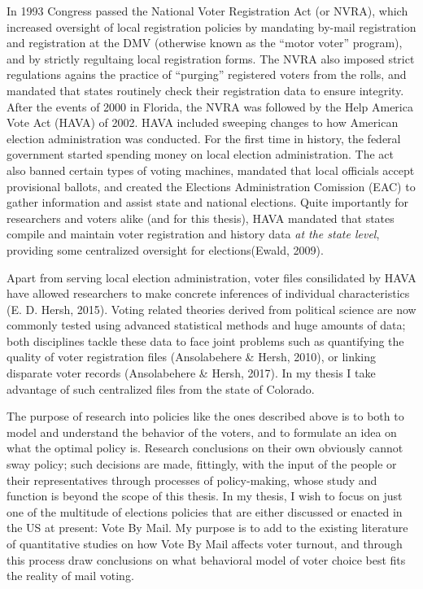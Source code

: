 \documentclass[12pt,twoside]{reedthesis}
\begin{document}
  In 1993 Congress passed the National Voter Registration Act (or NVRA),
  which increased oversight of local registration policies by mandating
  by-mail registration and registration at the DMV (otherwise known as the
  ``motor voter'' program), and by strictly regultaing local registration
  forms. The NVRA also imposed strict regulations agains the practice of
  ``purging'' registered voters from the rolls, and mandated that states
  routinely check their registration data to ensure integrity. After the
  events of 2000 in Florida, the NVRA was followed by the Help America
  Vote Act (HAVA) of 2002. HAVA included sweeping changes to how American
  election administration was conducted. For the first time in history,
  the federal government started spending money on local election
  administration. The act also banned certain types of voting machines,
  mandated that local officials accept provisional ballots, and created
  the Elections Administration Comission (EAC) to gather information and
  assist state and national elections. Quite importantly for researchers
  and voters alike (and for this thesis), HAVA mandated that states
  compile and maintain voter registration and history data \emph{at the
  state level}, providing some centralized oversight for elections(Ewald,
  2009).
  
  Apart from serving local election administration, voter files
  consilidated by HAVA have allowed researchers to make concrete
  inferences of individual characteristics (E. D. Hersh, 2015). Voting
  related theories derived from political science are now commonly tested
  using advanced statistical methods and huge amounts of data; both
  disciplines tackle these data to face joint problems such as quantifying
  the quality of voter registration files (Ansolabehere \& Hersh, 2010),
  or linking disparate voter records (Ansolabehere \& Hersh, 2017). In my
  thesis I take advantage of such centralized files from the state of
  Colorado.
  
  The purpose of research into policies like the ones described above is
  to both to model and understand the behavior of the voters, and to
  formulate an idea on what the optimal policy is. Research conclusions on
  their own obviously cannot sway policy; such decisions are made,
  fittingly, with the input of the people or their representatives through
  processes of policy-making, whose study and function is beyond the scope
  of this thesis. In my thesis, I wish to focus on just one of the
  multitude of elections policies that are either discussed or enacted in
  the US at present: Vote By Mail. My purpose is to add to the existing
  literature of quantitative studies on how Vote By Mail affects voter
  turnout, and through this process draw conclusions on what behavioral
  model of voter choice best fits the reality of mail voting.
  
\end{document}

